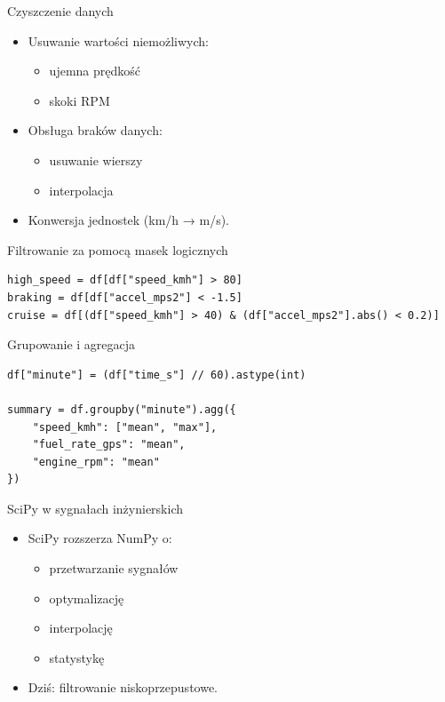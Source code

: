 \documentclass[aspectratio=169]{beamer}
\begin{document}
\begin{frame}{Czyszczenie danych}
  \begin{itemize}
    \item Usuwanie wartości niemożliwych:
      \begin{itemize}
        \item ujemna prędkość
        \item skoki RPM
      \end{itemize}
    \item Obsługa braków danych:
      \begin{itemize}
        \item usuwanie wierszy
        \item interpolacja
      \end{itemize}
    \item Konwersja jednostek (km/h → m/s).
  \end{itemize}
\end{frame}

\begin{frame}[fragile]{Filtrowanie za pomocą masek logicznych}
\begin{verbatim}
high_speed = df[df["speed_kmh"] > 80]
braking = df[df["accel_mps2"] < -1.5]
cruise = df[(df["speed_kmh"] > 40) & (df["accel_mps2"].abs() < 0.2)]
\end{verbatim}
\end{frame}

\begin{frame}[fragile]{Grupowanie i agregacja}
\begin{verbatim}
df["minute"] = (df["time_s"] // 60).astype(int)

summary = df.groupby("minute").agg({
    "speed_kmh": ["mean", "max"],
    "fuel_rate_gps": "mean",
    "engine_rpm": "mean"
})
\end{verbatim}
\end{frame}

\begin{frame}{SciPy w sygnałach inżynierskich}
  \begin{itemize}
    \item SciPy rozszerza NumPy o:
      \begin{itemize}
        \item przetwarzanie sygnałów
        \item optymalizację
        \item interpolację
        \item statystykę
      \end{itemize}
    \item Dziś: filtrowanie niskoprzepustowe.
  \end{itemize}
\end{frame}
\end{document}
